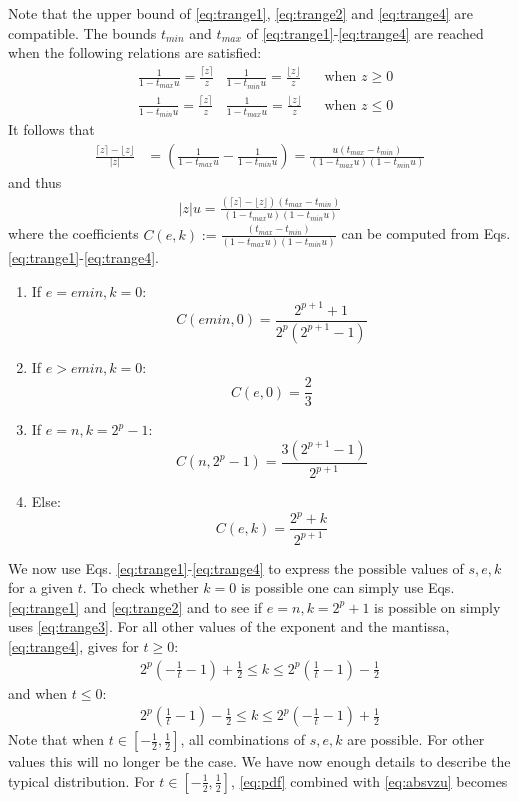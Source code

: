 \documentclass[10pt,a4paper]{article}
\theoremstyle{plain}
\theoremstyle{definition}
\newcommand{\ceil}[1]{\lceil #1 \rceil}
\newcommand{\floor}[1]{\lfloor #1 \rfloor}
\newcommand{\absv}[1]{\vert #1\vert}
\begin{document}
Note that the upper bound of \eqref{eq:trange1}, \eqref{eq:trange2} and \eqref{eq:trange4} are compatible.
The bounds $t_{min}$ and $t_{max}$ of \eqref{eq:trange1}-\eqref{eq:trange4} are reached when the following relations are satisfied:
\begin{align*}
&\frac{1}{1-t_{max}u}=\frac{\ceil{z}}{z} & \frac{1}{1-t_{min}u}=\frac{\floor{z}}{z} & &\text{when } z\geq 0\\
&\frac{1}{1-t_{min}u}=\frac{\ceil{z}}{z} & \frac{1}{1-t_{max}u}=\frac{\floor{z}}{z} & &\text{when } z\leq 0
\end{align*}
It follows that 
\begin{align*}
\frac{\ceil{z}-\floor{z}}{\absv{z}}&=\left(\frac{1}{1-t_{max}u}-\frac{1}{1-t_{min}u}\right)=\frac{u(t_{max}-t_{min})}{(1-t_{max}u)(1-t_{min}u)}
\end{align*}
and thus
\begin{align}
\absv{z}u=\frac{(\ceil{z}-\floor{z})(t_{max}-t_{min})}{(1-t_{max}u)(1-t_{min}u)}\label{eq:absvzu}
\end{align}
where the coefficients $C(e,k):=\frac{(t_{max}-t_{min})}{(1-t_{max}u)(1-t_{min}u)}$ can be computed from Eqs. \eqref{eq:trange1}-\eqref{eq:trange4}.
\begin{enumerate}
\item  If $e=emin, k=0$:
\[
C(emin,0)=\frac{2^{p+1}+1}{2^p(2^{p+1}-1)}
\]
\item If $e>emin, k=0$:
\[
C(e,0)=\frac{2}{3}
\]
\item  If $e=n, k=2^p-1$:
\[
C(n,2^p-1)=\frac{3(2^{p+1}-1)}{2^{p+1}}
\]
\item Else:
\[
C(e,k)=\frac{2^p+k}{2^{p+1}}
\]
\end{enumerate}


We now use Eqs. \eqref{eq:trange1}-\eqref{eq:trange4} to express the possible values of $s,e,k$ for a given $t$. To check whether $k=0$ is possible one can simply use Eqs. \eqref{eq:trange1} and \eqref{eq:trange2} and to see if $e=n, k=2^p+1$ is possible on simply uses \eqref{eq:trange3}. For all other values of the exponent and the mantissa, \eqref{eq:trange4}, gives for $t\geq 0$:
\begin{align}
2^p\left(-\frac{1}{t}-1\right)+\frac{1}{2}\leq k\leq 2^p\left(\frac{1}{t}-1\right)-\frac{1}{2}\label{eq:kfromtpos}
\end{align}
and when $t\leq 0$:
\begin{align}
2^p\left(\frac{1}{t}-1\right)-\frac{1}{2}\leq k\leq 2^p\left(-\frac{1}{t}-1\right)+\frac{1}{2}\label{eq:kfromtneg}
\end{align}
Note that when $t\in\left[-\frac{1}{2},\frac{1}{2}\right]$, all combinations of $s,e,k$ are possible. For other values this will no longer be the case.
We have now enough details to describe the typical distribution. For $t\in\left[-\frac{1}{2},\frac{1}{2}\right]$, \eqref{eq:pdf} combined with \eqref{eq:absvzu} becomes 
\end{document}
